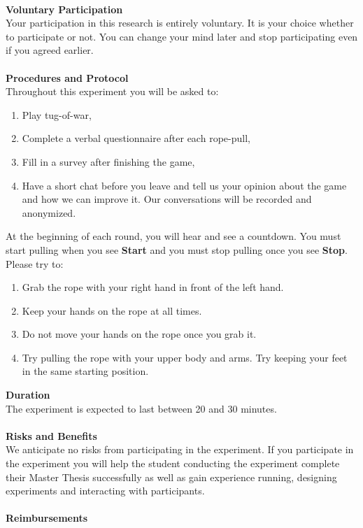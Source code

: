\\
\textbf{Voluntary Participation}\\
Your participation in this research is entirely voluntary. It is your choice whether to participate or not. You can change your mind later and stop participating even if you agreed earlier.\\
\\
\textbf{Procedures and Protocol}\\
Throughout this experiment you will be asked to:
\begin{enumerate}
\itemsep0em 
    \item Play tug-of-war,
    \item Complete a verbal questionnaire after each rope-pull, 
    \item  Fill in a survey after finishing the game,
    \item  Have a short chat before you leave and tell us your opinion about the game and how we can improve it. Our conversations will be recorded and anonymized. 
\end{enumerate}
At the beginning of each round, you will hear and see a countdown. You must start pulling when you see \textbf{Start} and you must stop pulling once you see \textbf{Stop}. \\
Please try to:
\begin{enumerate}
\itemsep0em
    \item Grab the rope with your right hand in front of the left hand.
  \item Keep your hands on the rope at all times. 
  \item Do not move your hands on the rope once you grab it.
  \item Try pulling the rope with your upper body and arms. Try keeping your feet in the same starting position.
\end{enumerate}
\textbf{Duration}\\
The experiment is expected to last between 20 and 30 minutes. \\
\\
\textbf{Risks and Benefits}\\
We anticipate no risks from participating in the experiment. If you participate in the experiment you will help the student conducting the experiment complete their Master Thesis successfully as well as gain experience running, designing experiments and interacting with participants.\\
\\
\textbf{Reimbursements}
